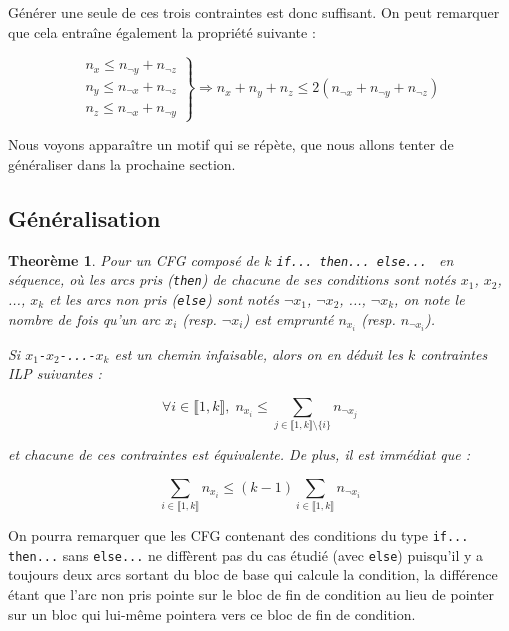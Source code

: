 \documentclass[french]{article}
\newtheorem{theorem}{Theorème}
\begin{document}
  Générer une seule de ces trois contraintes est donc suffisant. On peut remarquer que cela entraîne également la propriété suivante :

  \[
    \left.
    \begin{array}{c}
      n_x \leq n_{\neg y} + n_{\neg z}\\
      n_y \leq n_{\neg x} + n_{\neg z}\\
      n_z \leq n_{\neg x} + n_{\neg y}
    \end{array}
    \right\} \Longrightarrow n_x+n_y+n_z \leq 2(n_{\neg x} + n_{\neg y} + n_{\neg z})
  \]


  Nous voyons apparaître un motif qui se répète, que nous allons tenter de généraliser dans la prochaine section.

  \subsection{Généralisation}
  \begin{theorem}
    Pour un CFG composé de $k$ \texttt{if... then... else... } en séquence, où les arcs pris (\texttt{then}) de chacune de ses conditions sont notés $x_1$, $x_2$, ..., $x_k$ et les arcs non pris (\texttt{else}) sont notés $\neg x_1$, $\neg x_2$, ..., $\neg x_k$, on note le nombre de fois qu'un arc $x_i$ (resp. $\neg x_i$) est emprunté $n_{x_i}$ (resp. $n_{\neg x_i}$).

    Si $x_1$\texttt{-}$x_2$\texttt{-...-}$x_k$ est un chemin infaisable, alors on en déduit les $k$ contraintes ILP suivantes :

    \[\forall i \in \llbracket 1, k \rrbracket,\; n_{x_i} \leq \sum_{j \in \llbracket 1, k \rrbracket \setminus \{i\}} n_{\neg x_j} \]

    et chacune de ces contraintes est équivalente. De plus, il est immédiat que :

    \[ \sum_{i \in \llbracket 1, k \rrbracket} n_{x_i} \leq (k-1) \sum_{i \in \llbracket 1, k \rrbracket} n_{\neg x_i} \]
  \end{theorem}

  On pourra remarquer que les CFG contenant des conditions du type \texttt{if... then...} sans \texttt{else...} ne diffèrent pas du cas étudié (avec \texttt{else}) puisqu'il y a toujours deux arcs sortant du bloc de base qui calcule la condition, la différence étant que l'arc non pris pointe sur le bloc de fin de condition au lieu de pointer sur un bloc qui lui-même pointera vers ce bloc de fin de condition.
\end{document}

